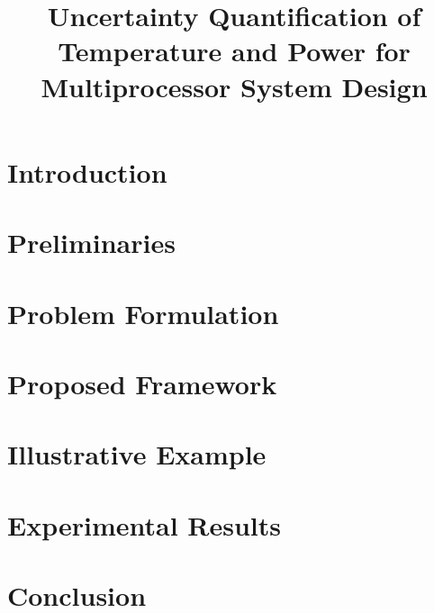 \documentclass[conference]{IEEEtran}
\begin{document}
  \title{Uncertainty Quantification of Temperature and Power for Multiprocessor System Design}

  \author{
    \and
    \and
  }

  \maketitle

  \begin{abstract}
    
  \end{abstract}

  \section{Introduction} 
  

  \section{Preliminaries}
  

  \section{Problem Formulation} 
  

  \section{Proposed Framework}
  

  \section{Illustrative Example} 
  

  \section{Experimental Results} 
  

  \section{Conclusion}
  

  \printbibliography
\end{document}
